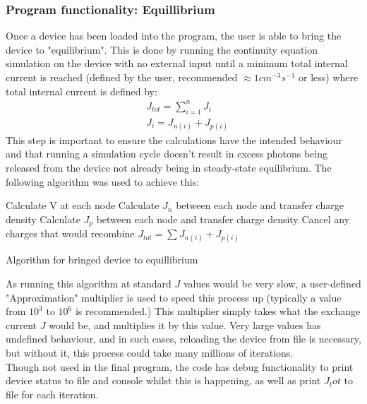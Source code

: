 \documentclass[titlepage]{article}
\begin{document}
\subsubsection{Program functionality: Equillibrium}
Once a device has been loaded into the program, the user is able to bring the device to "equilibrium". This is done by running the continuity equation simulation on the device with no external input until a minimum total internal current is reached (defined by the user, recommended $\approx 1cm^{-3}s^{-1}$ or less) where total internal current is defined by:
\begin{eqnarray}
	&J_{tot} = \sum\limits_{i=1}^{n}J_i\\
	&J_i = J_{n(i)}+J_{p(i)}
\end{eqnarray}
 This step is important to ensure the calculations have the intended behaviour and that running a simulation cycle doesn't result in excess photons being released from the device not already being in steady-state equilibrium. The following algorithm was used to achieve this:
\begin{algorithm}
	{
		Calculate V at each node\;
		Calculate $J_n$ between each node and transfer charge density\;
		Calculate $J_p$ between each node and transfer charge density\;
		Cancel any charges that would recombine\;
		$J_{tot} = \sum J_{n(i)}+J_{p(i)}$
	}
\caption{\label{alg:mic:Eqm}Algorithm for bringed device to equillibrium}
\end{algorithm}
As running this algorithm at standard $J$ values would be very slow, a user-defined "Approximation" multiplier is used to speed this process up (typically a value from $10^3$ to $10^6$ is recommended.) This multiplier simply takes what the exchange current $J$ would be, and multiplies it by this value. Very large values has undefined behaviour, and in such cases, reloading the device from file is necessary, but without it, this process could take many millions of iterations. \\
Though not used in the final program, the code has debug functionality to print device status to file and console whilst this is happening, as well as print $J_tot$ to file for each iteration.
\end{document}
